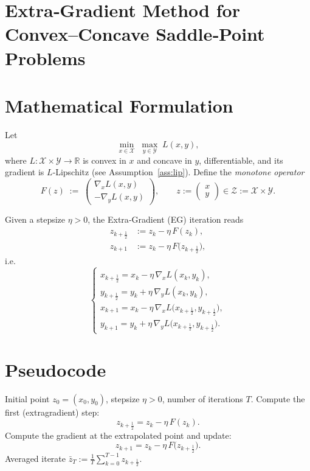 \documentclass{article}
\begin{document}
\section*{Extra‑Gradient Method for Convex–Concave Saddle‑Point Problems}

\section*{Mathematical Formulation}
Let 
\[
\min_{x\in\mathcal{X}}\; \max_{y\in\mathcal{Y}} \; L(x,y),
\]
where $L:\mathcal{X}\times\mathcal{Y}\rightarrow\mathbb{R}$ is convex in $x$ and concave in $y$, differentiable, and its gradient is $L$‑Lipschitz (see Assumption~\ref{ass:lip}).  
Define the \emph{monotone operator}
\[
F(z)\;:=\;\begin{pmatrix}
\nabla_{x}L(x,y)\\[2mm]
-\nabla_{y}L(x,y)
\end{pmatrix},
\qquad z:=\begin{pmatrix}x\\y\end{pmatrix}\in\mathcal{Z}:=\mathcal{X}\times\mathcal{Y}.
\]

Given a stepsize $\eta>0$, the Extra‑Gradient (EG) iteration reads
\[
\boxed{
\begin{aligned}
z_{k+\frac12} &:= z_k - \eta\,F(z_k),\\[1mm]
z_{k+1}      &:= z_k - \eta\,F\!\bigl(z_{k+\frac12}\bigr),
\end{aligned}}
\tag{EG}
\]
i.e.
\[
\begin{cases}
x_{k+\frac12}=x_k-\eta\,\nabla_x L(x_k,y_k),\\
y_{k+\frac12}=y_k+\eta\,\nabla_y L(x_k,y_k),\\[2mm]
x_{k+1}=x_k-\eta\,\nabla_x L\!\bigl(x_{k+\frac12},y_{k+\frac12}\bigr),\\
y_{k+1}=y_k+\eta\,\nabla_y L\!\bigl(x_{k+\frac12},y_{k+\frac12}\bigr).
\end{cases}
\tag{1}
\]

\section*{Pseudocode}
\begin{algorithm}[H]
\caption{Extra‑Gradient for $\min_x\max_y L(x,y)$}
\begin{algorithmic}[1]
\REQUIRE Initial point $z_0=(x_0,y_0)$, stepsize $\eta>0$, number of iterations $T$.
    \STATE Compute the first (extragradient) step:
    \[
    z_{k+\frac12}=z_k-\eta\,F(z_k).
    \]
    \STATE Compute the gradient at the extrapolated point and update:
    \[
    z_{k+1}=z_k-\eta\,F\!\bigl(z_{k+\frac12}\bigr).
    \]
\ENDFOR
\RETURN Averaged iterate $\displaystyle \bar z_T:=\frac1T\sum_{k=0}^{T-1}z_{k+\frac12}$.
\end{algorithmic}
\end{algorithm}
\end{document}
